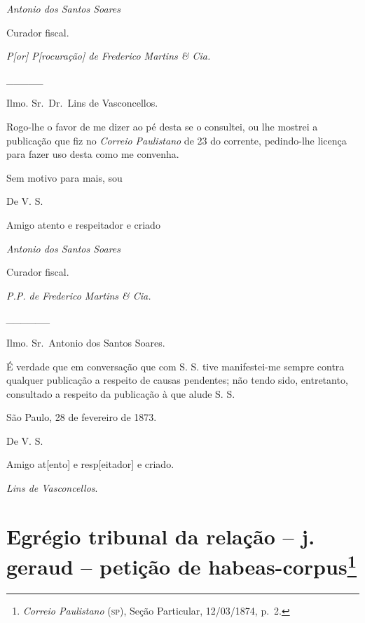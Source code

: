 \emph{Antonio dos Santos Soares}

Curador fiscal.

\emph{P{[}or{]} P{[}rocuração{]} de Frederico Martins \& Cia.}

\_\_\_\_\_

Ilmo. Sr.~Dr.~Lins de Vasconcellos.

Rogo-lhe o favor de me dizer ao pé desta se o consultei, ou lhe mostrei
a publicação que fiz no \emph{Correio Paulistano} de 23 do corrente,
pedindo-lhe licença para fazer uso desta como me convenha.

Sem motivo para mais, sou

De V. S.

Amigo atento e respeitador e criado

\emph{Antonio dos Santos Soares}

Curador fiscal.

\emph{P.P. de Frederico Martins \& Cia.}

\emph{\_\_\_\_\_\_}

Ilmo. Sr.~Antonio dos Santos Soares.

É verdade que em conversação que com S. S. tive manifestei-me sempre
contra qualquer publicação a respeito de causas pendentes; não tendo
sido, entretanto, consultado a respeito da publicação à que alude S. S.

São Paulo, 28 de fevereiro de 1873.

De V. S.

Amigo at{[}ento{]} e resp{[}eitador{]} e criado.

\emph{Lins de Vasconcellos}.

\chapter{Egrégio tribunal da relação -- j. geraud -- petição de habeas-corpus\footnote{\emph{Correio Paulistano} (\textsc{sp}), Seção Particular,
  12/03/1874, p.~2.}} %

